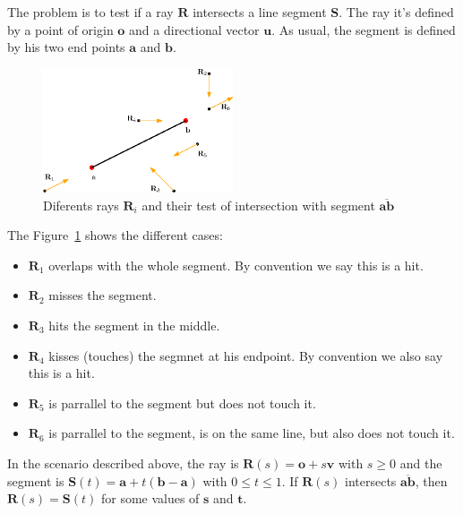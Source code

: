 The problem is to test if a ray $\mathbf{R}$ intersects a line segment $\mathbf{S}$.
The ray it's defined by a point of origin $\mathbf{o}$ and a directional vector $\mathbf{u}$.
As usual, the segment is defined by his two end points $\mathbf{a}$ and $\mathbf{b}$.

\begin{figure}[htb]
  \centering
  \includegraphics[width=0.50\textwidth]{img/segment2rays}
  \caption{Diferents rays $\mathbf{R}_i$ and their test of intersection with segment $\overline{\mathbf{a}\mathbf{b}}$}
  \label{fig:rays2seg}
\end{figure}

The Figure~\ref{fig:rays2seg} shows the different cases: 
\begin{itemize}
  \item $\mathbf{R}_1$ overlaps with the whole segment. By convention we say this is a hit.
  \item $\mathbf{R}_2$ misses the segment.
  \item $\mathbf{R}_3$ hits the segment in the middle.
  \item $\mathbf{R}_4$ kisses (touches) the segmnet  at his endpoint. By convention we also say this is a hit.
  \item $\mathbf{R}_5$ is parrallel to the segment but does not touch it.
  \item $\mathbf{R}_6$ is parrallel to the segment, is on the same line, but also does not touch it.
\end{itemize}

In the scenario described above, the ray is $\mathbf{R}(s) = \mathbf{o} + s \mathbf{v}$ with $s \geq 0$ and the segment is $\mathbf{S}(t) = \mathbf{a} + t (\mathbf{b} - \mathbf{a})$ with $0 \leq t \leq 1$.
If $\mathbf{R}(s)$ intersects $\overline{\mathbf{a}\mathbf{b}}$, then $\mathbf{R}(s) = \mathbf{S}(t)$ for some values of $\mathbf{s}$ and $\mathbf{t}$.

